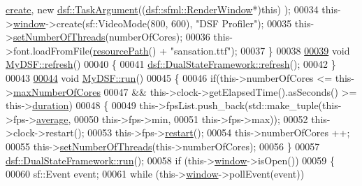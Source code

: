 \begin{DoxyCode}
      \hyperlink{class_my_d_s_f_1_1_sender_a44b80ad5f2e1c9b66b2beccdca6f2e9a}{create}, \textcolor{keyword}{new} \hyperlink{classyc_1_1_any}{dsf::TaskArgument}((\hyperlink{classdsf_1_1sfml_1_1_render_window}{dsf::sfml::RenderWindow}*)\textcolor{keyword}{this})
      );
00034     this->\hyperlink{classdsf_1_1sfml_1_1_render_window_a2c04b61ca1bfba140120001c4a9a30e1}{window}->create(sf::VideoMode(800, 600), \textcolor{stringliteral}{"DSF Profiler"});
00035     this->\hyperlink{classdsf_1_1_dual_state_framework_a8ab358a7456eeed264d53304b6562be4}{setNumberOfThreads}(numberOfCores);
00036     this->font.loadFromFile(\hyperlink{_resource_path_8hpp_a377b456e3964835648f2d726c2e4f510}{resourcePath}() + \textcolor{stringliteral}{"sansation.ttf"});
00037 \}
00038 
\hypertarget{_my_d_s_f_8cpp_source_l00039}{}\hyperlink{class_my_d_s_f_aca87f9fcb58b03edefec3ce1dbbcefc5}{00039} \textcolor{keywordtype}{void} \hyperlink{class_my_d_s_f_aca87f9fcb58b03edefec3ce1dbbcefc5}{MyDSF::refresh}()
00040 \{
00041     \hyperlink{classdsf_1_1_dual_state_framework_afe53c4d52bfb56b0b73c6b9fd397b007}{dsf::DualStateFramework::refresh}();
00042 \}
00043 
\hypertarget{_my_d_s_f_8cpp_source_l00044}{}\hyperlink{class_my_d_s_f_ad8c4269e040ef6373f36411cf8e5d2f2}{00044} \textcolor{keywordtype}{void} \hyperlink{class_my_d_s_f_ad8c4269e040ef6373f36411cf8e5d2f2}{MyDSF::run}()
00045 \{
00046     \textcolor{keywordflow}{if}(this->numberOfCores <= this->\hyperlink{class_my_d_s_f_a3ca13f96cce426bc99251a5b27616e16}{maxNumberOfCores}
00047        && this->clock->getElapsedTime().asSeconds() >= this->\hyperlink{class_my_d_s_f_a5216506e3952579bd83ebcf77013df15}{duration})
00048     \{
00049         this->fpsList.push\_back(std::make\_tuple(this->fps->\hyperlink{class_f_p_s_a5724af794ec15040b8b101dd0c547893}{average},
00050                                                 this->fps->min,
00051                                                 this->fps->max));
00052         this->clock->restart();
00053         this->fps->\hyperlink{class_f_p_s_a2804b8d6ff6f3670bc25fbbc53f5e689}{restart}();
00054         this->numberOfCores ++;
00055         this->\hyperlink{classdsf_1_1_dual_state_framework_a8ab358a7456eeed264d53304b6562be4}{setNumberOfThreads}(this->numberOfCores);
00056     \}
00057     \hyperlink{classdsf_1_1_dual_state_framework_a25b6b35182320df2cf02a8505b1ff83b}{dsf::DualStateFramework::run}();
00058     \textcolor{keywordflow}{if} (this->\hyperlink{classdsf_1_1sfml_1_1_render_window_a2c04b61ca1bfba140120001c4a9a30e1}{window}->isOpen())
00059     \{
00060         sf::Event event;
00061         \textcolor{keywordflow}{while} (this->\hyperlink{classdsf_1_1sfml_1_1_render_window_a2c04b61ca1bfba140120001c4a9a30e1}{window}->pollEvent(event))

\end{DoxyCode}
